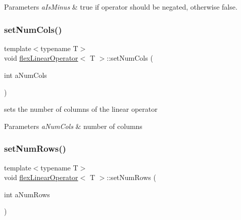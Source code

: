 \begin{DoxyParams}{Parameters}
{\em a\+Is\+Minus} & true if operator should be negated, otherwise false. \\
\hline
\end{DoxyParams}
\mbox{\label{classflex_linear_operator_add43d72e6e24ff2690fc3f1ea2578818}} 
\subsubsection{\texorpdfstring{set\+Num\+Cols()}{setNumCols()}}
{\footnotesize\ttfamily template$<$typename T$>$ \\
void \hyperlink{classflex_linear_operator}{flex\+Linear\+Operator}$<$ T $>$\+::set\+Num\+Cols (\begin{DoxyParamCaption}\item[{int}]{a\+Num\+Cols }\end{DoxyParamCaption})\hspace{0.3cm}{\ttfamily [inline]}}



sets the number of columns of the linear operator 


\begin{DoxyParams}{Parameters}
{\em a\+Num\+Cols} & number of columns \\
\hline
\end{DoxyParams}
\mbox{\label{classflex_linear_operator_a14ea80aaa2a6d3c468f6bf38452f1001}} 
\subsubsection{\texorpdfstring{set\+Num\+Rows()}{setNumRows()}}
{\footnotesize\ttfamily template$<$typename T$>$ \\
void \hyperlink{classflex_linear_operator}{flex\+Linear\+Operator}$<$ T $>$\+::set\+Num\+Rows (\begin{DoxyParamCaption}\item[{int}]{a\+Num\+Rows }\end{DoxyParamCaption})\hspace{0.3cm}{\ttfamily [inline]}}



